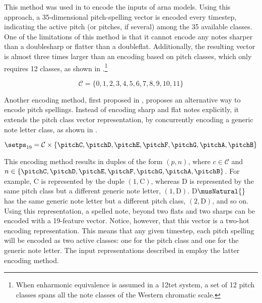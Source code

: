 This method was used in \textcite{micchi2020not,
micchi2021deep} to encode the inputs of \gls{arna} models.
Using this approach, a 35-dimensional pitch-spelling vector
is encoded every timestep, indicating the active pitch (or
pitches, if several) among the 35 available classes. One of
the limitations of this method is that it cannot encode any
notes sharper than a \gls{doublesharp} or flatter than a
\gls{doubleflat}. Additionally, the resulting vector is
almost three times larger than an encoding based on pitch
classes, which only requires 12 classes, as shown in
.\footnote{When enharmonic equivalence
is assumed in a \gls{12tet} system, a set of 12 pitch
classes spans all the note classes of the Western chromatic
scale.}

\begin{equation}
    \label{eq:pitch_classes}
    \mathcal{C} = \{0, 1, 2, 3, 4, 5, 6, 7, 8, 9, 10, 11\}
\end{equation}



Another encoding method, first proposed in
\textcite{napoleslopez2021augmentednet}, proposes an
alternative way to encode pitch spellings. Instead of
encoding \gls{sharp} and \gls{flat} notes explicitly, it
extends the pitch class vector representation, by
concurrently encoding a generic note letter class, as shown
in .

\begin{equation}
    \label{eq:pitch_spelling_19}
    \setps_{19} = \mathcal{C}
    \times \{ \pitchC, \pitchD, \pitchE, \pitchF, \pitchG, \pitchA, \pitchB \}
\end{equation}


This encoding method results in duples of the form $(p, n)$,
where $c \in \mathcal{C}$ and $n \in \{\pitchC, \pitchD,
\pitchE, \pitchF, \pitchG, \pitchA, \pitchB\}$. For example,
C\musSharp{} is represented by the duple $(1, \text{C})$,
whereas D\musFlat{} is represented by the same pitch class
but a different generic note letter, $(1, \text{D})$.
D$\musNatural{}$ has the same generic note letter but a
different pitch class, $(2, \text{D})$, and so on. Using
this representation, a spelled note, beyond two flats and
two sharps can be encoded with a 19-feature vector. Notice,
however, that this vector is a two-hot encoding
representation. This means that any given timestep, each
pitch spelling will be encoded as two active classes: one
for the pitch class and one for the generic note letter. The
input representations described in
 employ the latter encoding
method.
